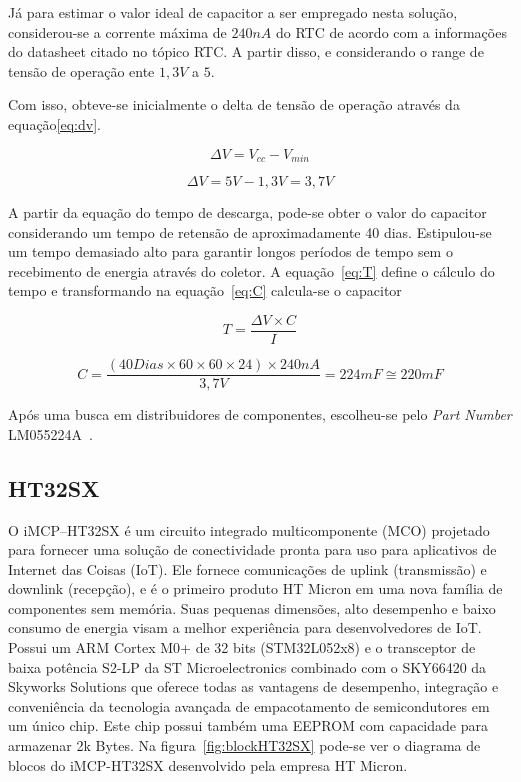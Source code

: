Já para estimar o valor ideal de capacitor a ser empregado nesta solução, considerou-se a corrente máxima de $240nA$ do RTC de acordo com a informações do datasheet citado no tópico RTC. A partir disso, e considerando o range de tensão de operação ente $1,3V$ a $5$.

Com isso, obteve-se inicialmente o delta de tensão de operação através da equação\ref{eq:dv}.



\begin{equation}
    \Delta V = V_{cc}-V_{min}
  \label{eq:dv}
\end{equation}


\begin{equation}
     \Delta V =5V-1,3V = 3,7V
\end{equation}

A partir da equação do tempo de descarga, pode-se obter o valor do capacitor considerando um tempo de retensão de aproximadamente 40 dias. Estipulou-se um tempo demasiado alto para garantir longos períodos de tempo sem o recebimento de energia através do coletor. A equação~\ref{eq:T} define o cálculo do tempo e transformando na equação~\ref{eq:C} calcula-se o capacitor


\begin{equation}
    T=\frac{\Delta V \times C}{I}
  \label{eq:T}
\end{equation}


\begin{equation}
    C=\frac{(40 Dias\times 60\times60\times24) \times 240nA}{3,7V} = 224mF \cong 220mF
      \label{eq:C}
\end{equation}

Após uma busca em distribuidores de componentes, escolheu-se pelo \textit{Part Number} LM055224A~\cite{Ohmite}.


\subsection{HT32SX}
O iMCP–HT32SX é um circuito integrado multicomponente (MCO) projetado para fornecer uma solução de conectividade pronta para uso para aplicativos de Internet das Coisas (IoT). Ele fornece comunicações de uplink (transmissão) e downlink (recepção), e é o primeiro produto HT Micron em uma nova família de componentes sem memória. Suas pequenas dimensões, alto desempenho e baixo consumo de energia visam a melhor experiência para desenvolvedores de IoT. Possui um ARM Cortex M0+ de 32 bits (STM32L052x8) e o transceptor de baixa potência S2-LP da ST Microelectronics combinado com o SKY66420 da Skyworks Solutions que oferece todas as vantagens de desempenho, integração e conveniência da tecnologia avançada de empacotamento de semicondutores em um único chip. Este chip possui também uma EEPROM com capacidade para armazenar 2k Bytes. Na figura~\ref{fig:blockHT32SX} pode-se ver o diagrama de blocos do iMCP-HT32SX desenvolvido pela empresa HT Micron.


